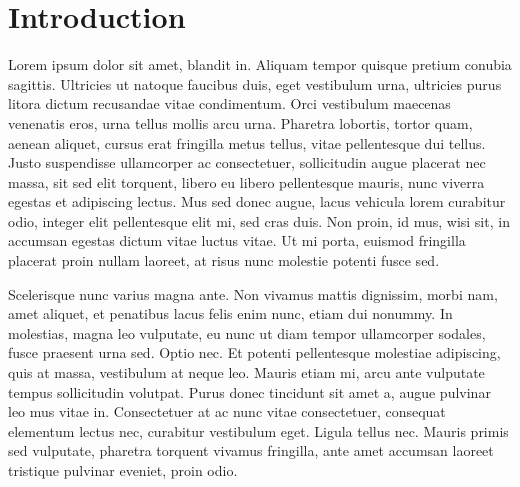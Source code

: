 \section*{Introduction}
\begin{singlespace}
\im
Lorem ipsum dolor sit amet, blandit in.
Aliquam tempor quisque pretium conubia sagittis.
Ultricies ut natoque faucibus duis, eget vestibulum urna, ultricies purus litora dictum recusandae vitae condimentum.
Orci vestibulum maecenas venenatis eros, urna tellus mollis arcu urna.
Pharetra lobortis, tortor quam, aenean aliquet, cursus erat fringilla metus tellus, vitae pellentesque dui tellus.
Justo suspendisse ullamcorper ac consectetuer, sollicitudin augue placerat nec massa, sit sed elit torquent, libero eu libero pellentesque mauris, nunc viverra egestas et adipiscing lectus.
Mus sed donec augue, lacus vehicula lorem curabitur odio, integer elit pellentesque elit mi, sed cras duis.
Non proin, id mus, wisi sit, in accumsan egestas dictum vitae luctus vitae.
Ut mi porta, euismod fringilla placerat proin nullam laoreet, at risus nunc molestie potenti fusce sed.
\end{singlespace}

\begin{singlespace}
\bi
Scelerisque nunc varius magna ante.
Non vivamus mattis dignissim, morbi nam, amet aliquet, et penatibus lacus felis enim nunc, etiam dui nonummy.
In molestias, magna leo vulputate, eu nunc ut diam tempor ullamcorper sodales, fusce praesent urna sed.
Optio nec.
Et potenti pellentesque molestiae adipiscing, quis at massa, vestibulum at neque leo.
Mauris etiam mi, arcu ante vulputate tempus sollicitudin volutpat.
Purus donec tincidunt sit amet a, augue pulvinar leo mus vitae in.
Consectetuer at ac nunc vitae consectetuer, consequat elementum lectus nec, curabitur vestibulum eget.
Ligula tellus nec.
Mauris primis sed vulputate, pharetra torquent vivamus fringilla, ante amet accumsan laoreet tristique pulvinar eveniet, proin odio.
\end{singlespace}
